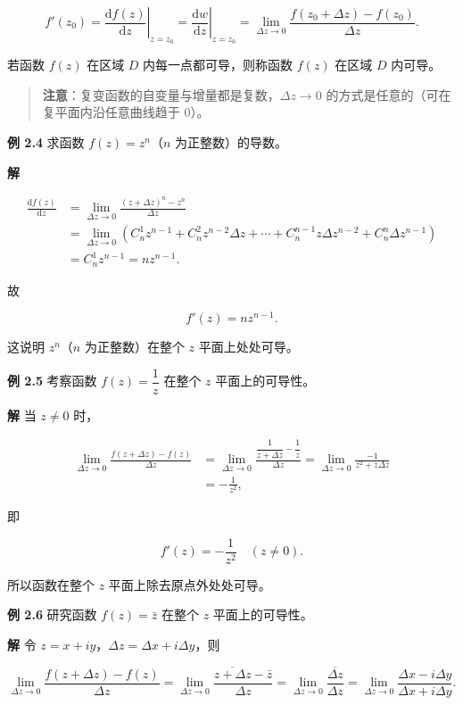 \[
f'(z_0)=\left.\frac{\mathrm{d}f(z)}{\mathrm{d}z}\right|_{z=z_0}
=\left.\frac{\mathrm{d}w}{\mathrm{d}z}\right|_{z=z_0}
=\lim_{\Delta z\to0}\frac{f(z_0+\Delta z)-f(z_0)}{\Delta z}.
\]

若函数 \(f(z)\) 在区域 \(D\) 内每一点都可导，则称函数 \(f(z)\) 在区域
\(D\) 内可导。

\begin{quote}
\textbf{注意}：复变函数的自变量与增量都是复数，\(\Delta z\to0\)
的方式是任意的（可在复平面内沿任意曲线趋于 \(0\)）。
\end{quote}

\textbf{例 2.4} 求函数 \(f(z)=z^n\)（\(n\) 为正整数）的导数。

\textbf{解}

\[
\begin{aligned}
\frac{\mathrm{d}f(z)}{\mathrm{d}z}
&=\lim_{\Delta z\to0}\frac{(z+\Delta z)^n-z^n}{\Delta z}\\
&=\lim_{\Delta z\to0}\left(C_n^1z^{n-1}+C_n^2z^{n-2}\Delta z+\cdots+C_n^{n-1}z\Delta z^{n-2}+C_n^n\Delta z^{n-1}\right)\\
&=C_n^1z^{n-1}=nz^{n-1}.
\end{aligned}
\]

故

\[
f'(z)=nz^{n-1}.
\]

这说明 \(z^n\)（\(n\) 为正整数）在整个 \(z\) 平面上处处可导。

\textbf{例 2.5} 考察函数 \(f(z)=\dfrac{1}{z}\) 在整个 \(z\)
平面上的可导性。

\textbf{解} 当 \(z\neq 0\) 时，

\[
\begin{aligned}
\lim_{\Delta z\to0}\frac{f(z+\Delta z)-f(z)}{\Delta z}
&=\lim_{\Delta z\to0}\frac{\dfrac{1}{z+\Delta z}-\dfrac{1}{z}}{\Delta z}
=\lim_{\Delta z\to0}\frac{-1}{z^2+z\Delta z}\\
&=-\frac{1}{z^2},
\end{aligned}
\]

即

\[
f'(z)=-\frac{1}{z^2}\quad (z\neq 0).
\]

所以函数在整个 \(z\) 平面上除去原点外处处可导。

\textbf{例 2.6} 研究函数 \(f(z)=\bar z\) 在整个 \(z\) 平面上的可导性。

\textbf{解} 令 \(z=x+iy\)，\(\Delta z=\Delta x+i\Delta y\)，则

\[
\lim_{\Delta z\to0}\frac{f(z+\Delta z)-f(z)}{\Delta z}
=\lim_{\Delta z\to0}\frac{\overline{z+\Delta z}-\bar z}{\Delta z}
=\lim_{\Delta z\to0}\frac{\overline{\Delta z}}{\Delta z}
=\lim_{\Delta z\to0}\frac{\Delta x-i\Delta y}{\Delta x+i\Delta y}.
\]

